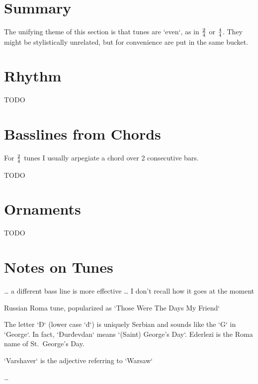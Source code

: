 
\section{Summary}
The unifying theme of this section is that tunes
are `even`, as in ${2}\over{4}$ or ${4}\over{4}$.
They might be stylistically unrelated, but for convenience
are put in the same bucket.

\section{Rhythm}
TODO

\section{Basslines from Chords}
For $2\over4$ tunes I usually arpegiate a chord over 2 consecutive bars.

TODO

\section{Ornaments}
TODO

\section{Notes on Tunes}
\begin{description}[noitemsep]
\item[Hora ca la Caval]
	\dots
	a different bass line is more effective
	\dots
    I don't recall how it goes at the moment
\item[Dorogoj Dlinnoju]
	Russian Roma tune, popularized as
	`Those Were The Days My Friend`
\item[Ederlezi / Đurđevdan]
	The letter `Đ` (lower case `đ`) is uniquely Serbian
	and sounds like the `G` in `George`.  In fact,
	`Đurđevdan` means `(Saint) George's Day`.
	Ederlezi is the Roma name of St.\ George's Day.
\item[Varshaver Freylekhs] `Varshaver` is the adjective
	referring to `Warsaw`
\item[TODO] \dots
\end{description}


